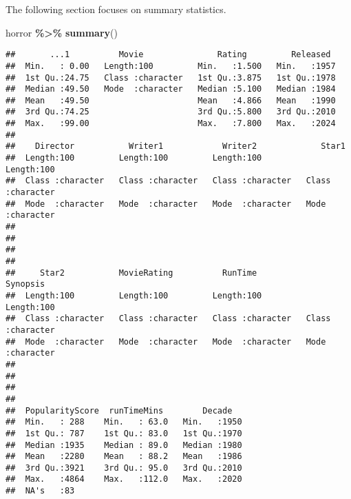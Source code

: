 \documentclass[
]{article}
\newenvironment{Shaded}{\begin{snugshade}}{\end{snugshade}}
\newcommand{\FunctionTok}[1]{\textcolor[rgb]{0.13,0.29,0.53}{\textbf{#1}}}
\newcommand{\NormalTok}[1]{#1}
\newcommand{\SpecialCharTok}[1]{\textcolor[rgb]{0.81,0.36,0.00}{\textbf{#1}}}
\begin{document}
The following section focuses on summary statistics.

\begin{Shaded}
\begin{Highlighting}[]
\NormalTok{horror }\SpecialCharTok{\%\textgreater{}\%} 
  \FunctionTok{summary}\NormalTok{()}
\end{Highlighting}
\end{Shaded}

\begin{verbatim}
##       ...1          Movie               Rating         Released   
##  Min.   : 0.00   Length:100         Min.   :1.500   Min.   :1957  
##  1st Qu.:24.75   Class :character   1st Qu.:3.875   1st Qu.:1978  
##  Median :49.50   Mode  :character   Median :5.100   Median :1984  
##  Mean   :49.50                      Mean   :4.866   Mean   :1990  
##  3rd Qu.:74.25                      3rd Qu.:5.800   3rd Qu.:2010  
##  Max.   :99.00                      Max.   :7.800   Max.   :2024  
##                                                                   
##    Director           Writer1            Writer2             Star1          
##  Length:100         Length:100         Length:100         Length:100        
##  Class :character   Class :character   Class :character   Class :character  
##  Mode  :character   Mode  :character   Mode  :character   Mode  :character  
##                                                                             
##                                                                             
##                                                                             
##                                                                             
##     Star2           MovieRating          RunTime            Synopsis        
##  Length:100         Length:100         Length:100         Length:100        
##  Class :character   Class :character   Class :character   Class :character  
##  Mode  :character   Mode  :character   Mode  :character   Mode  :character  
##                                                                             
##                                                                             
##                                                                             
##                                                                             
##  PopularityScore  runTimeMins        Decade    
##  Min.   : 288    Min.   : 63.0   Min.   :1950  
##  1st Qu.: 787    1st Qu.: 83.0   1st Qu.:1970  
##  Median :1935    Median : 89.0   Median :1980  
##  Mean   :2280    Mean   : 88.2   Mean   :1986  
##  3rd Qu.:3921    3rd Qu.: 95.0   3rd Qu.:2010  
##  Max.   :4864    Max.   :112.0   Max.   :2020  
##  NA's   :83
\end{verbatim}
\end{document}
